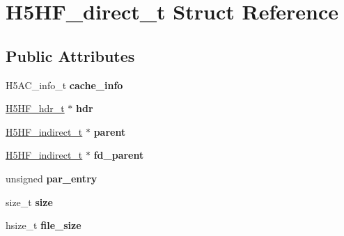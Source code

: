 \hypertarget{struct_h5_h_f__direct__t}{}\section{H5\+H\+F\+\_\+direct\+\_\+t Struct Reference}
\label{struct_h5_h_f__direct__t}
\subsection*{Public Attributes}
\begin{DoxyCompactItemize}
\item 
\mbox{\label{struct_h5_h_f__direct__t_a6e0b780d81e221ac14653bdfb222d18e}} 
H5\+A\+C\+\_\+info\+\_\+t {\bfseries cache\+\_\+info}
\item 
\mbox{\label{struct_h5_h_f__direct__t_a7773e680405f8931cea033495694dabd}} 
\hyperlink{struct_h5_h_f__hdr__t}{H5\+H\+F\+\_\+hdr\+\_\+t} $\ast$ {\bfseries hdr}
\item 
\mbox{\label{struct_h5_h_f__direct__t_a8bf85e67c86f39720bf2fc10cb26754a}} 
\hyperlink{struct_h5_h_f__indirect__t}{H5\+H\+F\+\_\+indirect\+\_\+t} $\ast$ {\bfseries parent}
\item 
\mbox{\label{struct_h5_h_f__direct__t_ad329f6ffbe3f3104dc50be5d4bc0d560}} 
\hyperlink{struct_h5_h_f__indirect__t}{H5\+H\+F\+\_\+indirect\+\_\+t} $\ast$ {\bfseries fd\+\_\+parent}
\item 
\mbox{\label{struct_h5_h_f__direct__t_aed83a18ecc75e84ef9a2e3d366b8a0ae}} 
unsigned {\bfseries par\+\_\+entry}
\item 
\mbox{\label{struct_h5_h_f__direct__t_a1df9c2307e7fcf4cb0f5283f45ee6579}} 
size\+\_\+t {\bfseries size}
\item 
\mbox{\label{struct_h5_h_f__direct__t_a5380e58a544ac09967d3008c8da2d909}} 
hsize\+\_\+t {\bfseries file\+\_\+size}
\item 
\mbox{\label{struct_h5_h_f__direct__t_a07eea637b7b7cadf2acd05d75c95a2c2}} 

\end{DoxyCompactItemize}
